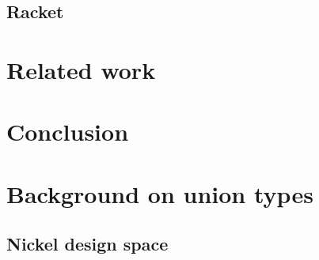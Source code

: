 \documentclass[sigplan,10pt,review,anonymous]{acmart}
\newcommand{\unsure}[2][1=]{}
\newcommand{\info}[2][1=]{}
\begin{document}




\unsure{Is it worth mentioning how continuations are formed?
Should we go so techincal?}

\subsection{Racket}
\label{sec:racket}

\unsure{Todo}


\newpage

\section{Related work}
\info{Including a mention of statically typed systems with union}
\info{Include something about Racket's and and or contracts}

\newpage

\section{Conclusion}



\appendix


\section{Background on union types}

\subsection{Nickel design space}
\end{document}
